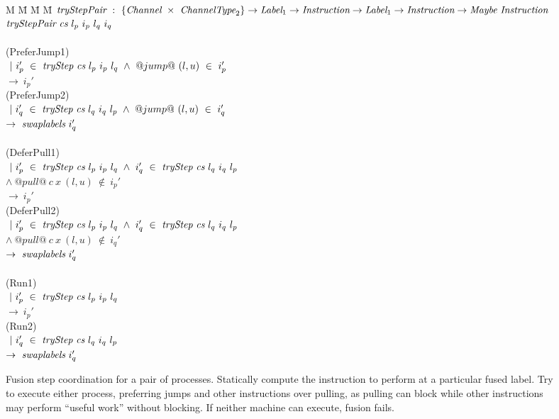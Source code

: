 
\newcommand\nextStep[5]{\big((#1,~#2),~(#3,~#4),~#5 \big)}


\newcommand\note[1]{\textcolor{notec}{(#1)}}

\begin{figure}
\begin{tabbing}
M \= M \= M \= M \kill
$\textit{tryStepPair} ~:~ \{\textit{Channel} ~\times~ \textit{ChannelType}_2\} \to \textit{Label}_1 \to \textit{Instruction} \to \textit{Label}_1 \to \textit{Instruction} \to \textit{Maybe}~\textit{Instruction}$ \\
$\textit{tryStepPair} ~\textit{cs}~l_p~i_p~l_q~i_q$ \\
\\

\> \note{PreferJump1} \\
\> $~|~i_p'~\in~\textit{tryStep}~\textit{cs}~l_p~i_p~l_q ~\wedge~@jump@~(l,u)~\in~i_p'$ \\
\> $\to~i_p'$ \\
\> \note{PreferJump2} \\
\> $~|~i_q'~\in~\textit{tryStep}~\textit{cs}~l_q~i_q~l_p ~\wedge~@jump@~(l,u)~\in~i_q'$ \\
\> $\to~\textit{swaplabels}~i_q'$ \\
\\

\> \note{DeferPull1} \\
\> $~|~i_p'~\in~\textit{tryStep}~\textit{cs}~l_p~i_p~l_q ~\wedge~ i_q'~\in~\textit{tryStep}~\textit{cs}~l_q~i_q~l_p$ \\
\> $\wedge~@pull@~c~x~(l,u)~\not\in~i_p'$ \\
\> $\to~i_p'$ \\
\> \note{DeferPull2} \\
\> $~|~i_p'~\in~\textit{tryStep}~\textit{cs}~l_p~i_p~l_q ~\wedge~i_q'~\in~\textit{tryStep}~\textit{cs}~l_q~i_q~l_p$ \\
\> $\wedge~@pull@~c~x~(l,u)~\not\in~i_q'$ \\
\> $\to~\textit{swaplabels}~i_q'$ \\
\\

\> \note{Run1} \\
\> $~|~i_p'~\in~\textit{tryStep}~\textit{cs}~l_p~i_p~l_q$ \\
\> $\to~i_p'$ \\
\> \note{Run2} \\
\> $~|~i_q'~\in~\textit{tryStep}~\textit{cs}~l_q~i_q~l_p$ \\
\> $\to~\textit{swaplabels}~i_q'$ \\

\end{tabbing}
\caption{Fusion step coordination for a pair of processes.
Statically compute the instruction to perform at a particular fused label.
Try to execute either process, preferring jumps and other instructions over pulling, as pulling can block while other instructions may perform ``useful work'' without blocking.
If neither machine can execute, fusion fails.}
\label{fig:Fusion:Def:StepPair}
\end{figure}

